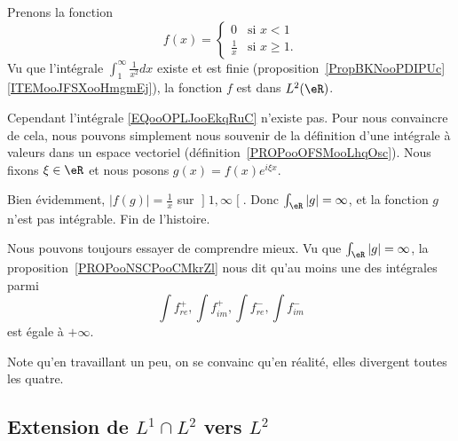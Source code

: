 \begin{example}     \label{EXooSWCHooTdHTsl}
    Prenons la fonction
    \begin{equation}
        f(x)=\begin{cases}
            0    &   \text{si } x<1\\
            \frac{1}{ x }   &    \text{si } x\geq 1.
        \end{cases}
    \end{equation}
    Vu que l'intégrale \( \int_1^{\infty}\frac{1}{ x^2 }dx\) existe et est finie (proposition~\ref{PropBKNooPDIPUc}\ref{ITEMooJFSXooHmgmEj}), la fonction \( f\) est dans \( L^2(\eR)\).

    Cependant l'intégrale \eqref{EQooOPLJooEkqRuC} n'existe pas. Pour nous convaincre de cela, nous pouvons simplement nous souvenir de la définition d'une intégrale à valeurs dans un espace vectoriel (définition~\ref{PROPooOFSMooLhqOsc}). Nous fixons \( \xi\in \eR\) et nous posons \( g(x)=f(x) e^{i\xi x}\).

    Bien évidemment, \( | f(g) |=\frac{1}{ x }\) sur \( \mathopen] 1 , \infty \mathclose[\). Donc \( \int_{\eR}| g |=\infty\), et la fonction \( g\) n'est pas intégrable. Fin de l'histoire.

        Nous pouvons toujours essayer de comprendre mieux. Vu que \( \int_{\eR}| g |=\infty\), la proposition~\ref{PROPooNSCPooCMkrZl} nous dit qu'au moins une des intégrales parmi
        \begin{equation}
            \int f^+_{re}, \int f^+_{im},\int f^-_{re},\int f^-_{im}
        \end{equation}
        est égale à \( +\infty\).

        Note qu'en travaillant un peu, on se convainc qu'en réalité, elles divergent toutes les quatre.
\end{example}

\subsection{Extension de \( L^1\cap L^2\) vers \( L^2\)}

